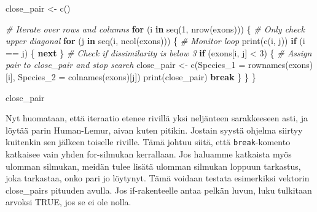 \documentclass[
]{book}
\newenvironment{Shaded}{\begin{snugshade}}{\end{snugshade}}
\newcommand{\AttributeTok}[1]{\textcolor[rgb]{0.77,0.63,0.00}{#1}}
\newcommand{\CommentTok}[1]{\textcolor[rgb]{0.56,0.35,0.01}{\textit{#1}}}
\newcommand{\ControlFlowTok}[1]{\textcolor[rgb]{0.13,0.29,0.53}{\textbf{#1}}}
\newcommand{\DecValTok}[1]{\textcolor[rgb]{0.00,0.00,0.81}{#1}}
\newcommand{\FunctionTok}[1]{\textcolor[rgb]{0.00,0.00,0.00}{#1}}
\newcommand{\NormalTok}[1]{#1}
\newcommand{\OtherTok}[1]{\textcolor[rgb]{0.56,0.35,0.01}{#1}}
\newcommand{\SpecialCharTok}[1]{\textcolor[rgb]{0.00,0.00,0.00}{#1}}
\begin{document}
\begin{Shaded}
\begin{Highlighting}[]
\NormalTok{close\_pair }\OtherTok{\textless{}{-}} \FunctionTok{c}\NormalTok{()}

\CommentTok{\# Iterate over rows and columns}
\ControlFlowTok{for}\NormalTok{ (i }\ControlFlowTok{in} \FunctionTok{seq}\NormalTok{(}\DecValTok{1}\NormalTok{, }\FunctionTok{nrow}\NormalTok{(exons))) \{}
  \CommentTok{\# Only check upper diagonal}
  \ControlFlowTok{for}\NormalTok{ (j }\ControlFlowTok{in} \FunctionTok{seq}\NormalTok{(i, }\FunctionTok{ncol}\NormalTok{(exons))) \{}
    \CommentTok{\# Monitor loop}
    \FunctionTok{print}\NormalTok{(}\FunctionTok{c}\NormalTok{(i, j))}
    \ControlFlowTok{if}\NormalTok{ (i }\SpecialCharTok{==}\NormalTok{ j) \{}
        \ControlFlowTok{next}
\NormalTok{    \}}
    \CommentTok{\# Check if dissimilarity is below 3}
    \ControlFlowTok{if}\NormalTok{ (exons[i, j] }\SpecialCharTok{\textless{}} \DecValTok{3}\NormalTok{) \{}
      \CommentTok{\# Assign pair to close\_pair and stop search}
\NormalTok{      close\_pair }\OtherTok{\textless{}{-}} \FunctionTok{c}\NormalTok{(}\AttributeTok{Species\_1 =} \FunctionTok{rownames}\NormalTok{(exons)[i],}
                            \AttributeTok{Species\_2 =} \FunctionTok{colnames}\NormalTok{(exons)[j])}
      \FunctionTok{print}\NormalTok{(close\_pair)}
      \ControlFlowTok{break}
\NormalTok{    \}}
\NormalTok{  \}}
\NormalTok{\}}

\NormalTok{close\_pair}
\end{Highlighting}
\end{Shaded}

Nyt huomataan, että iteraatio etenee rivillä yksi neljänteen sarakkeeseen asti, ja löytää parin Human-Lemur, aivan kuten pitikin. Jostain syystä ohjelma siirtyy kuitenkin sen jälkeen toiselle riville. Tämä johtuu siitä, että \texttt{break}-komento katkaisee vain yhden for-silmukan kerrallaan. Jos haluamme katkaista myös ulomman silmukan, meidän tulee lisätä ulomman silmukan loppuun tarkastus, joka tarkastaa, onko pari jo löytynyt. Tämä voidaan testata esimerkiksi vektorin close\_pairs pituuden avulla. Jos if-rakenteelle antaa pelkän luvun, luku tulkitaan arvoksi TRUE, jos se ei ole nolla.
\end{document}
